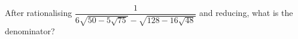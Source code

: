 After rationalising $\dfrac{1}{6\sqrt{50-5\sqrt{75}}-\sqrt{128-16\sqrt{48}}}$ and reducing, what is the denominator?

